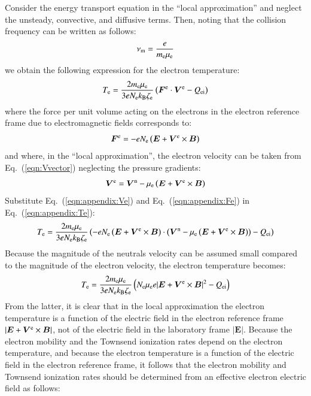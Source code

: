 \documentclass{warpdoc}
\renewcommand{\vec}[1]{\bm{#1}}
\begin{document}
Consider the energy transport equation in the ``local approximation'' and neglect the unsteady, convective, and diffusive terms. Then, noting that the collision frequency can be written as follows:
%
\begin{equation}
\nu_{\rm m}=\frac{e}{m_{\rm e}\mu_{\rm e}}
\end{equation}
%
we obtain the following expression for the electron temperature:
%
\begin{equation}
  T_{\rm e}  
=  
 \frac{2 m_{\rm e} \mu_{\rm e}}{3 e N_{\rm e} k_{\rm B} \zeta_{\rm e} }
\left(  \vec{F}^{\rm e}\cdot \vec{V}^{\rm e}
 - Q_{\rm ei}\right)
\label{eqn:appendix:Te}
 \end{equation}
%
where the force per unit volume acting on the electrons in the electron reference frame due to electromagnetic fields  corresponds to:
%
\begin{equation}
\vec{F}^{\rm e} = -eN_{\rm e}\left(\vec{E} + \vec{V}^{\rm e} \times \vec{B}\right)
\label{eqn:appendix:Fe}
\end{equation}
%
and where, in the ``local approximation'',  the electron velocity can be taken from Eq.\ (\ref{eqn:Vvector}) neglecting the pressure gradients:
%
\begin{equation}
  \vec{V}^{\rm e}=\vec{V}^{\rm n} - \mu_{\rm e} \left(\vec{E}+\vec{V}^{\rm e} \times \vec{B}\right)
\label{eqn:appendix:Ve}
\end{equation}
% 
Substitute Eq.\ (\ref{eqn:appendix:Ve}) and Eq.\ (\ref{eqn:appendix:Fe}) in Eq.\ (\ref{eqn:appendix:Te}):
%
\begin{equation}
  T_{\rm e}  
=  
 \frac{2 m_{\rm e} \mu_{\rm e}}{3 e N_{\rm e} k_{\rm B} \zeta_{\rm e} }
\left( -e N_{\rm e} \left(\vec{E} + \vec{V}^{\rm e} \times \vec{B}\right)\cdot \left(\vec{V}^{\rm n} - \mu_{\rm e} \left(\vec{E}+\vec{V}^{\rm e} \times \vec{B}\right)\right)
 - Q_{\rm ei}\right)
 \end{equation}
%
Because the magnitude of the neutrals velocity can be assumed small compared to the magnitude of the electron velocity, the electron temperature becomes:
%
\begin{equation}
  T_{\rm e}  
=  
 \frac{2 m_{\rm e} \mu_{\rm e}}{3 e N_{\rm e} k_{\rm B} \zeta_{\rm e} }
\left(  N_{\rm e} \mu_{\rm e} e |\vec{E}+\vec{V}^{\rm e}\times \vec{B}|^2
 - Q_{\rm ei}\right)
 \end{equation}
%
From the latter, it is clear that in the local approximation the electron temperature is a function of the electric field in the electron reference frame $|\vec{E}+\vec{V}^{\rm e}\times \vec{B}|$, not of the electric field in the laboratory frame $|\vec{E}|$. Because the electron mobility and the Townsend ionization rates depend on the electron temperature, and because the electron temperature is a function of the electric field in the electron reference frame, it follows that the electron mobility and Townsend ionization rates should be determined from an effective electron electric field as follows: 
\end{document}

